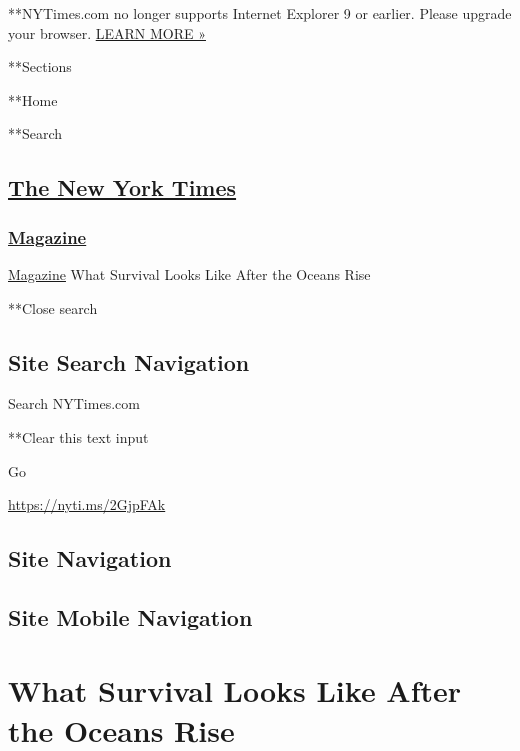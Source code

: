  **NYTimes.com no longer supports Internet Explorer 9 or earlier. Please
upgrade your browser.
\href{http://www.nytimes.com/content/help/site/ie9-support.html}{LEARN
MORE »}

**Sections

**Home

**Search

\hypertarget{the-new-york-times}{%
\subsection{\texorpdfstring{\href{http://www.nytimes.com/}{The New York
Times}}{The New York Times}}\label{the-new-york-times}}

\hypertarget{-magazine-}{%
\subsubsection{\texorpdfstring{
\href{https://www.nytimes.com/section/magazine}{Magazine}
}{ Magazine }}\label{-magazine-}}

 \href{https://www.nytimes.com/section/magazine}{Magazine}
\textbar{}What Survival Looks Like After the Oceans Rise

**Close search

\hypertarget{site-search-navigation}{%
\subsection{Site Search Navigation}\label{site-search-navigation}}

Search NYTimes.com

**Clear this text input

Go

\url{https://nyti.ms/2GjpFAk}

\hypertarget{site-navigation}{%
\subsection{Site Navigation}\label{site-navigation}}

\hypertarget{site-mobile-navigation}{%
\subsection{Site Mobile Navigation}\label{site-mobile-navigation}}

\hypertarget{what-survival-looks-like-after-the-oceans-rise}{%
\section{What Survival Looks Like After the Oceans
Rise}\label{what-survival-looks-like-after-the-oceans-rise}}

